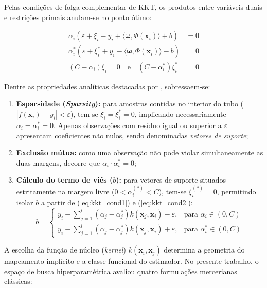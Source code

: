 Pelas condições de folga complementar de \gls{KKT}, os produtos entre variáveis duais e restrições primais anulam-se no ponto ótimo:

\begin{align}
    \alpha_i(\varepsilon + \xi_i - y_i + \langle \boldsymbol{\omega}, \Phi(\mathbf{x}_i) \rangle + b) &= 0 \label{eq:kkt_cond1} \\
    \alpha_i^*(\varepsilon + \xi_i^* + y_i - \langle \boldsymbol{\omega}, \Phi(\mathbf{x}_i) \rangle - b) &= 0 \label{eq:kkt_cond2} \\
    (C - \alpha_i)\xi_i = 0 \quad \text{e} \quad (C - \alpha_i^*)\xi_i^* &= 0 \label{eq:kkt_cond3}
\end{align}

Dentre as propriedades analíticas destacadas por , sobressaem-se:
\begin{enumerate}
    \item \textbf{Esparsidade (\textit{Sparsity}):} para amostras contidas no interior do tubo ($|f(\mathbf{x}_i) - y_i| < \varepsilon$), tem-se $\xi_i = \xi_i^* = 0$, implicando necessariamente $\alpha_i = \alpha_i^* = 0$. Apenas observações com resíduo igual ou superior a $\varepsilon$ apresentam coeficientes não nulos, sendo denominadas \textit{vetores de suporte};
    \item \textbf{Exclusão mútua:} como uma observação não pode violar simultaneamente as duas margens, decorre que $\alpha_i \cdot \alpha_i^* = 0$;
    \item \textbf{Cálculo do termo de viés ($b$):} para vetores de suporte situados estritamente na margem livre ($0 < \alpha_i^{(*)} < C$), tem-se $\xi_i^{(*)} = 0$, permitindo isolar $b$ a partir de (\ref{eq:kkt_cond1}) e (\ref{eq:kkt_cond2}):
    \begin{equation}
    b = 
    \begin{cases}
    y_i - \sum_{j=1}^{l}(\alpha_j - \alpha_j^*) k(\mathbf{x}_j, \mathbf{x}_i) - \varepsilon, & \text{para } \alpha_i \in (0, C) \\
    y_i - \sum_{j=1}^{l}(\alpha_j - \alpha_j^*) k(\mathbf{x}_j, \mathbf{x}_i) + \varepsilon, & \text{para } \alpha_i^* \in (0, C)
    \end{cases} \label{eq:calculo_bias}
    \end{equation}
\end{enumerate}

A escolha da função de núcleo (\textit{kernel}) $k(\mathbf{x}_i, \mathbf{x}_j)$ determina a geometria do mapeamento implícito e a classe funcional do estimador. No presente trabalho, o espaço de busca hiperparamétrica avaliou quatro formulações mercerianas clássicas:

